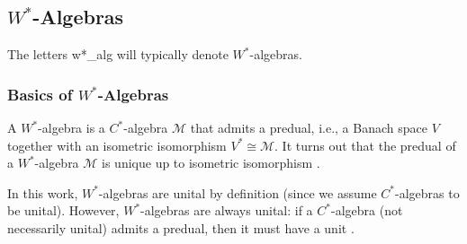 \subsection{\( W^* \)-Algebras}


The letters \gls{w*_alg} will typically denote $W^*$-algebras.

\subsubsection{Basics of \( W^* \)-Algebras}

\begin{definition}
A \( W^* \)-algebra is a \( C^* \)-algebra \( \mathscr{M} \) that admits a predual, i.e., a Banach space \( V \) together with an isometric isomorphism \( V^* \cong  \mathscr{M} \). It turns out that the predual of a \( W^* \)-algebra \(  \mathscr{M} \) is unique up to isometric isomorphism \cite[Corollary 1.13.3]{sakaiCAlgebrasWAlgebras1998}. 
\end{definition}

\begin{remark}
 In this work, \( W^* \)-algebras are unital by definition (since we assume \( C^* \)-algebras to be unital).  However, \( W^* \)-algebras are always unital: if a \( C^* \)-algebra (not necessarily unital) admits a predual, then it must have a unit \cite[Chapter 1.7]{sakaiCAlgebrasWAlgebras1998}.
\end{remark}


